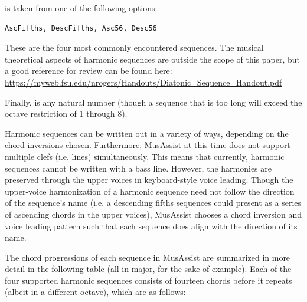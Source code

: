 \documentclass{report}
\newcommand\param[1]{\textttu{<#1>}}
\begin{document}
\param{HARMSEQTYPE} is taken from one of the following options:
\begin{verbatim}
AscFifths, DescFifths, Asc56, Desc56
\end{verbatim}

These are the four most commonly encountered sequences. The musical theoretical aspects of harmonic sequences are outside the scope of this paper, but a good reference for review can be found here: \href{https://myweb.fsu.edu/nrogers/Handouts/Diatonic_Sequence_Handout.pdf}{https://myweb.fsu.edu/nrogers/Handouts/Diatonic\_Sequence\_Handout.pdf}

Finally, \param{LENGTH} is any natural number (though a sequence that is too long will exceed the octave restriction of 1 through 8).

Harmonic sequences can be written out in a variety of ways, depending on the chord inversions chosen. Furthermore, MusAssist at this time does not support multiple clefs (i.e. lines) simultaneously. This means that currently, harmonic sequences cannot be written with a bass line. However, the harmonies are preserved through the upper voices in keyboard-style voice leading. Though the upper-voice harmonization of a harmonic sequence need not follow the direction of the sequence's name (i.e. a descending fifths sequences could present as a series of ascending chords in the upper voices), MusAssist chooses a chord inversion and voice leading pattern such that each sequence does align with the direction of its name. 

The chord progressions of each sequence in MusAssist are summarized in more detail in the following table (all in major, for the sake of example). Each of the four supported harmonic sequences consists of fourteen chords before it repeats (albeit in a different octave), which are as follows:
\end{document}
